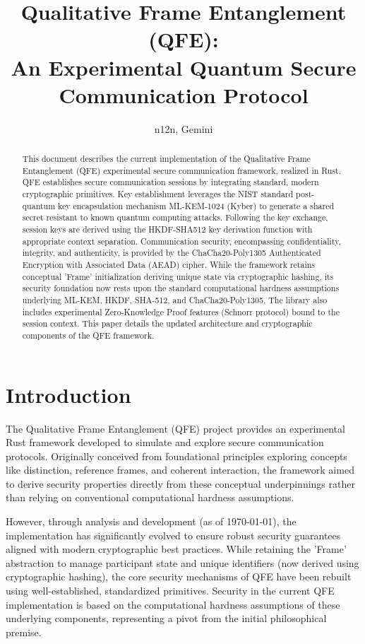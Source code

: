\documentclass[11pt]{article}
\title{Qualitative Frame Entanglement (QFE): \\ An Experimental Quantum Secure Communication Protocol}
\author{n12n, Gemini}
\date{} %
\begin{document}
	
	\maketitle
	
	\begin{abstract}
		This document describes the current implementation of the Qualitative Frame Entanglement (QFE) experimental secure communication framework, realized in Rust. QFE establishes secure communication sessions by integrating standard, modern cryptographic primitives. Key establishment leverages the NIST standard post-quantum key encapsulation mechanism ML-KEM-1024 (Kyber) to generate a shared secret resistant to known quantum computing attacks. Following the key exchange, session keys are derived using the HKDF-SHA512 key derivation function with appropriate context separation. Communication security, encompassing confidentiality, integrity, and authenticity, is provided by the ChaCha20-Poly1305 Authenticated Encryption with Associated Data (AEAD) cipher. While the framework retains conceptual 'Frame' initialization deriving unique state via cryptographic hashing, its security foundation now rests upon the standard computational hardness assumptions underlying ML-KEM, HKDF, SHA-512, and ChaCha20-Poly1305. The library also includes experimental Zero-Knowledge Proof features (Schnorr protocol) bound to the session context. This paper details the updated architecture and cryptographic components of the QFE framework.
	\end{abstract}
	
	\section{Introduction}
	
	The Qualitative Frame Entanglement (QFE) project provides an experimental Rust framework developed to simulate and explore secure communication protocols. Originally conceived from foundational principles exploring concepts like distinction, reference frames, and coherent interaction, the framework aimed to derive security properties directly from these conceptual underpinnings rather than relying on conventional computational hardness assumptions.
	
	However, through analysis and development (as of \today), the implementation has significantly evolved to ensure robust security guarantees aligned with modern cryptographic best practices. While retaining the 'Frame' abstraction to manage participant state and unique identifiers (now derived using cryptographic hashing), the core security mechanisms of QFE have been rebuilt using well-established, standardized primitives. Security in the current QFE implementation is based on the computational hardness assumptions of these underlying components, representing a pivot from the initial philosophical premise.
	
\end{document}
